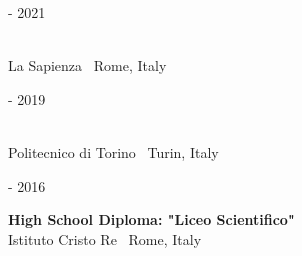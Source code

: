 \begin{minipage}{.3\textwidth}
	 - 2021 \faCalendar
\end{minipage}
\hfill
\begin{minipage}{.65\textwidth}
	\vfill
	 \\
	\color{Maroon} La Sapienza \hfill \color{Sepia} \faMapMarker \ Rome, Italy
	\vfill
\end{minipage}

\bigskip

\begin{minipage}{.3\textwidth}
	 - 2019 \faCalendar
\end{minipage}
\hfill
\begin{minipage}{.65\textwidth}
	\vfill
	 \\
	\color{Maroon} Politecnico di Torino \hfill \color{Sepia} \faMapMarker \ Turin, Italy
	\vfill
\end{minipage}

\bigskip

\begin{minipage}{.3\textwidth}
	 - 2016 \faCalendar
\end{minipage}
\hfill
\begin{minipage}{.64\textwidth}
	\vfill
	{\large \textbf{High School Diploma: "Liceo Scientifico"}} \\
	\color{Maroon} Istituto Cristo Re \hfill \color{Sepia} \faMapMarker \ Rome, Italy 
	\vfill
\end{minipage}